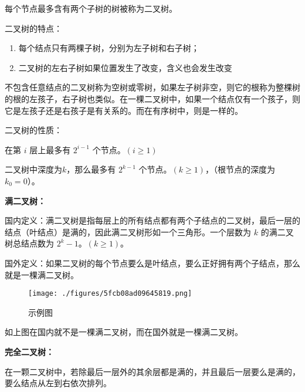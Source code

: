 
每个节点最多含有两个子树的树被称为二叉树。

二叉树的特点：

\begin{enumerate}
\item 每个结点只有两棵子树，分别为左子树和右子树；
\item 二叉树的左右子树如果位置发生了改变，含义也会发生改变
\end{enumerate}

不包含任意结点的二叉树称为空树或零树，如果左子树非空，则它的根称为整棵树的根的左孩子，右子树也类似。在一棵二叉树中，如果一个结点仅有一个孩子，则它是左孩子还是右孩子是有关系的。而在有序树中，则是一样的。

二叉树的性质：

在第 $i$ 层上最多有 $2 ^ {i - 1}$ 个节点。$(i\geq1)$

二叉树中深度为$k$，那么最多有 $2 ^ {k - 1}$ 个节点。$(k\geq1)$，（根节点的深度为 $k_0 = 0$）。

\textbf{满二叉树：}

国内定义：满二叉树是指每层上的所有结点都有两个子结点的二叉树，最后一层的结点（叶结点）是满的，因此满二叉树形如一个三角形。一个层数为 $k$ 的满二叉树总结点数为 $2^k - 1$。$(k\geq1)$。

国外定义：如果二叉树的每个节点要么是叶结点，要么正好拥有两个子结点，那么就是一棵满二叉树。

\begin{figure}[ht]
\centering
\texttt{[image: ./figures/5fcb08ad09645819.png]}
\caption{示例图} \label{fig_tree_2}
\end{figure}

如上图在国内就不是一棵满二叉树，而在国外就是一棵满二叉树。

\textbf{完全二叉树：}

在一颗二叉树中，若除最后一层外的其余层都是满的，并且最后一层要么是满的，要么结点从左到右依次排列。
